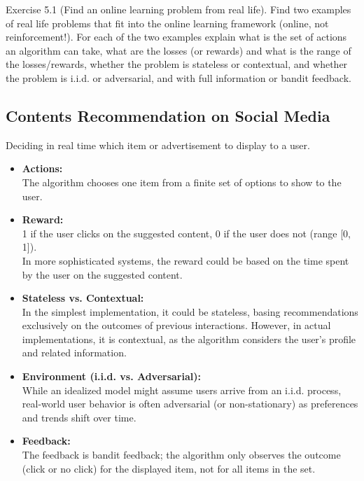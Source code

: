 Exercise 5.1 (Find an online learning problem from real life). Find two examples of real life problems
that fit into the online learning framework (online, not reinforcement!). For each of the two examples
explain what is the set of actions an algorithm can take, what are the losses (or rewards) and what is the
range of the losses/rewards, whether the problem is stateless or contextual, and whether the problem is
i.i.d. or adversarial, and with full information or bandit feedback.

\subsection{Contents Recommendation on Social Media}

Deciding in real time which item or advertisement to display to a user.

\begin{itemize}
\item \textbf{Actions:} \\
The algorithm chooses one item from a finite set of options to show to the user.

\item \textbf{Reward:} \\
1 if the user clicks on the suggested content, 0 if the user does not (range [0, 1]). \\
In more sophisticated systems, the reward could be based on the time spent by the user on the suggested content.

\item \textbf{Stateless vs. Contextual:} \\
In the simplest implementation, it could be stateless, basing recommendations exclusively on the outcomes of previous interactions.
However, in actual implementations, it is contextual, as the algorithm considers the user's profile and related information.

\item \textbf{Environment (i.i.d. vs. Adversarial):} \\
While an idealized model might assume users arrive from an i.i.d. process, real-world user behavior is often adversarial (or non-stationary) as preferences and trends shift over time.

\item \textbf{Feedback:} \\
The feedback is bandit feedback; the algorithm only observes the outcome (click or no click) for the displayed item, not for all items in the set.
\end{itemize}

